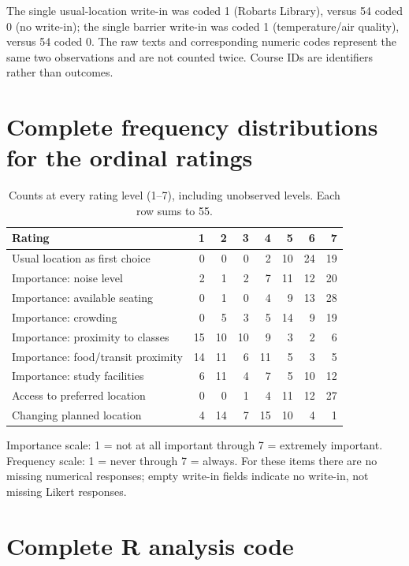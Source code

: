 \documentclass[11pt,letterpaper]{article}
\begin{document}
The single usual-location write-in was coded 1 (Robarts Library), versus 54 coded 0 (no write-in); the single barrier write-in was coded 1 (temperature/air quality), versus 54 coded 0. The raw texts and corresponding numeric codes represent the same two observations and are not counted twice. Course IDs are identifiers rather than outcomes.

\section{Complete frequency distributions for the ordinal ratings}\label{app:ratings}
\begin{table}[H]\centering\scriptsize
\begin{tabular}{@{}p{6.6cm}rrrrrrr@{}}\toprule
Rating & 1 & 2 & 3 & 4 & 5 & 6 & 7\\\midrule
Usual location as first choice & 0 & 0 & 0 & 2 & 10 & 24 & 19\\
Importance: noise level & 2 & 1 & 2 & 7 & 11 & 12 & 20\\
Importance: available seating & 0 & 1 & 0 & 4 & 9 & 13 & 28\\
Importance: crowding & 0 & 5 & 3 & 5 & 14 & 9 & 19\\
Importance: proximity to classes & 15 & 10 & 10 & 9 & 3 & 2 & 6\\
Importance: food/transit proximity & 14 & 11 & 6 & 11 & 5 & 3 & 5\\
Importance: study facilities & 6 & 11 & 4 & 7 & 5 & 10 & 12\\
Access to preferred location & 0 & 0 & 1 & 4 & 11 & 12 & 27\\
Changing planned location & 4 & 14 & 7 & 15 & 10 & 4 & 1\\\bottomrule\end{tabular}
\caption{Counts at every rating level (1--7), including unobserved levels. Each row sums to 55.}
\end{table}

Importance scale: 1 = not at all important through 7 = extremely important. Frequency scale: 1 = never through 7 = always. For these items there are no missing numerical responses; empty write-in fields indicate no write-in, not missing Likert responses.


\clearpage
\section{Complete R analysis code}\label{app:code}
\end{document}
